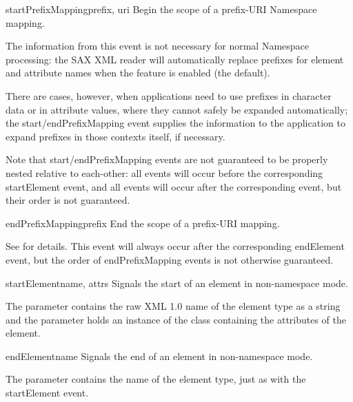 \begin{methoddesc}[ContentHandler]{startPrefixMapping}{prefix, uri}
  Begin the scope of a prefix-URI Namespace mapping.
        
  The information from this event is not necessary for normal
  Namespace processing: the SAX XML reader will automatically replace
  prefixes for element and attribute names when the
   feature is enabled (the default).

  
  There are cases, however, when applications need to use prefixes in
  character data or in attribute values, where they cannot safely be
  expanded automatically; the start/endPrefixMapping event supplies
  the information to the application to expand prefixes in those
  contexts itself, if necessary.
  
  Note that start/endPrefixMapping events are not guaranteed to be
  properly nested relative to each-other: all
   events will occur before the
  corresponding startElement event, and all 
  events will occur after the corresponding  event,
  but their order is not guaranteed.
\end{methoddesc}

\begin{methoddesc}[ContentHandler]{endPrefixMapping}{prefix}
  End the scope of a prefix-URI mapping.
        
  See  for details. This event will always
  occur after the corresponding endElement event, but the order of
  endPrefixMapping events is not otherwise guaranteed.
\end{methoddesc}

\begin{methoddesc}[ContentHandler]{startElement}{name, attrs}
  Signals the start of an element in non-namespace mode.

  The  parameter contains the raw XML 1.0 name of the
  element type as a string and the  parameter holds an
  instance of the  class containing the attributes
  of the element.
\end{methoddesc}

\begin{methoddesc}[ContentHandler]{endElement}{name}
  Signals the end of an element in non-namespace mode.

  The  parameter contains the name of the element type, just
  as with the startElement event.
\end{methoddesc}

